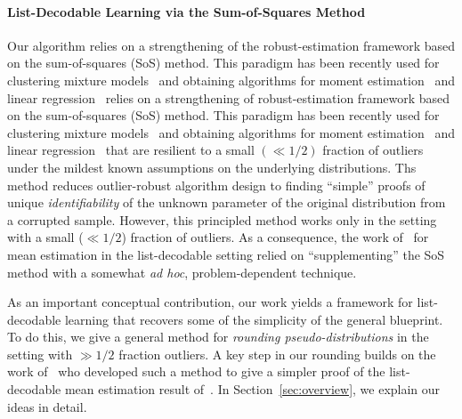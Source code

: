 


\paragraph{List-Decodable Learning via the Sum-of-Squares Method} Our algorithm relies on a strengthening of the robust-estimation framework based on the sum-of-squares (SoS) method. This paradigm has been recently used for clustering mixture models~\cite{HopkinsLi17,KothariSteinhardt17} and obtaining algorithms for moment estimation~\cite{2017KS} and linear regression~\cite{DBLP:conf/colt/KlivansKM18}
 relies on a strengthening of robust-estimation framework based on the sum-of-squares (SoS) method. This paradigm has been recently used for clustering mixture models~\cite{HopkinsLi17,KothariSteinhardt17} and obtaining algorithms for moment estimation~\cite{2017KS} and linear regression~\cite{DBLP:conf/colt/KlivansKM18} that are resilient to a small $(\ll 1/2)$ fraction of outliers under the mildest known assumptions on the underlying distributions. Ths method reduces outlier-robust algorithm design to finding ``simple'' proofs of  unique \emph{identifiability} of the unknown parameter of the original distribution from a corrupted sample. However, this principled method works only in the setting with a small ($\ll 1/2$) fraction of outliers. As a consequence, the work of~\cite{KothariSteinhardt17} for mean estimation in the list-decodable setting relied on ``supplementing'' the SoS method with a somewhat \emph{ad hoc}, problem-dependent technique. 

As an important conceptual contribution, our work yields a framework for list-decodable learning that recovers some of the simplicity of the general blueprint. To do this, we give a general method for \emph{rounding pseudo-distributions} in the setting with $\gg 1/2$ fraction outliers. A key step in our rounding builds on the work of~\cite{KS19} who developed such a method to give a simpler proof of the list-decodable mean estimation result of~\cite{KothariSteinhardt17}. In Section~\ref{sec:overview}, we explain our ideas in detail. 

